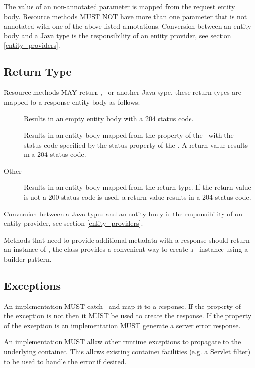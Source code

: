 The value of an non-annotated  parameter is mapped from the request entity body. Resource methods MUST NOT have more than one parameter that is not annotated with one of the above-listed annotations. Conversion between an entity body and a Java type is the responsibility of an entity provider, see section \ref{entity_providers}.

\subsection{Return Type}
\label{resource_method_return}

Resource methods MAY return , \Response\ or another Java type, these return types are mapped to a response entity body as follows:

\begin{description}
\item[] Results in an empty entity body with a 204 status code.
\item[\Response] Results in an entity body mapped from the  property of the \Response\ with the status code specified by the status property of the \Response. A  return value results in a 204 status code.
\item[Other] Results in an entity body mapped from the return type. If the return value is not  a 200 status code is used, a  return value results in a 204 status code.
\end{description}

Conversion between a Java types and an entity body is the responsibility of an entity provider, see section \ref{entity_providers}.

Methods that need to provide additional metadata with a response should return an instance of \Response, the \Response{} class provides a convenient way to create a \Response\ instance using a builder pattern.

\subsection{Exceptions}

An implementation MUST catch \WebAppExc\ and map it to a response. If the  property of the exception is not  then it MUST be used to create the response. If the  property of the exception is  an implementation MUST generate a server error response.

An implementation MUST allow other runtime exceptions to propagate to the underlying container. This allows existing container facilities (e.g. a Servlet filter) to be used to handle the error if desired.

